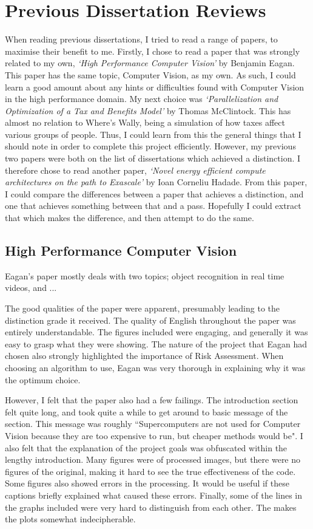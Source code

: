 \section{Previous Dissertation Reviews}
  When reading previous dissertations, I tried to read a range of papers, to maximise their benefit to me.
  Firstly, I chose to read a paper that was strongly related to my own, \emph{`High Performance Computer Vision'} by Benjamin Eagan.
  This paper has the same topic,  Computer Vision, as my own.
  As such, I could learn a good amount about any hints or difficulties found with Computer Vision in the high performance domain.
  My next choice was \emph{`Parallelization and Optimization of a Tax and Benefits Model'} by Thomas McClintock. 
  This has almost no relation to Where's Wally, being a simulation of how taxes affect various groups of people.
  Thus, I could learn from this the general things that I should note in order to complete this project efficiently.
  However, my previous two papers were both on the list of dissertations which achieved a distinction.
  I therefore chose to read another paper, \emph{`Novel energy efficient compute architectures on the path to Exascale'} by Ioan Corneliu Hadade.
  From this paper, I could compare the differences between a paper that achieves a distinction, and one that achieves something between that and a pass.
  Hopefully I could extract that which makes the difference, and then attempt to do the same.
\subsection{High Performance Computer Vision}
  Eagan's paper mostly deals with two topics; object recognition in real time videos, and ...
  
  The good qualities of the paper were apparent, presumably leading to the distinction grade it received.
  The quality of English throughout the paper was entirely understandable.
  The figures included were engaging, and generally it was easy to grasp what they were showing.
  The nature of the project that Eagan had chosen also strongly highlighted the importance of Risk Assessment.
  When choosing an algorithm to use, Eagan was very thorough in explaining why it was the optimum choice.

  However, I felt that the paper also had a few failings.
  The introduction section felt quite long, and took quite a while to get around to basic message of the section.
  This message was roughly ``Supercomputers are not used for Computer Vision because they are too expensive to run, but cheaper methods would be".
  I also felt that the explanation of the project goals was obfuscated within the lengthy introduction.
  Many figures were of processed images, but there were no figures of the original, making it hard to see the true effectiveness of the code.
  Some figures also showed errors in the processing.
  It would be useful if these captions briefly explained what caused these errors.
  Finally, some of the lines in the graphs included were very hard to distinguish from each other.
  The makes the plots somewhat indecipherable.  


